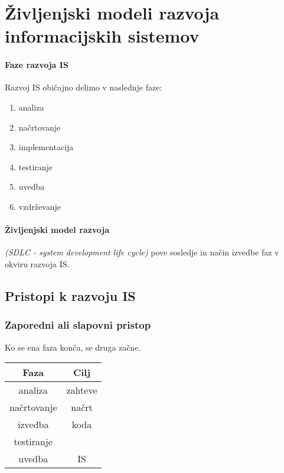 \documentclass[a4paper,12pt]{report}
\begin{document}
   \section{Življenjski modeli razvoja informacijskih sistemov}

   \paragraph{Faze razvoja IS} Razvoj IS običajno delimo v naslednje faze:
      \begin{enumerate}
         \item analiza
         \item načrtovanje
         \item implementacija
         \item testiranje
         \item uvedba
         \item vzdrževanje
      \end{enumerate}
   \paragraph{Življenjski model razvoja} \textit{(SDLC - system development life cycle)} pove sosledje in način izvedbe faz v okviru razvoja IS.

   \pagebreak

   \subsection{Pristopi k razvoju IS}
   \subsubsection{Zaporedni ali slapovni pristop}
   Ko se ena faza konča, se druga začne.

   \begin{center}
      \begin{tabular}{|c|c|}
         \hline
         \textbf{Faza} & \textbf{Cilj}\\
         \hline
         analiza & zahteve\\
         načrtovanje & načrt\\
         izvedba & koda\\
         testiranje&\\
         uvedba&IS\\
         \hline
      \end{tabular}
   \end{center}
\end{document}
